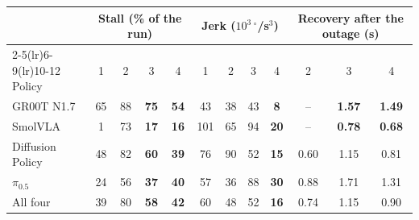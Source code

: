 \begin{tabular}{l cccc cccc ccc}
\toprule
 & \multicolumn{4}{c}{Stall (\% of the run)} & \multicolumn{4}{c}{Jerk ($10^3\,^\circ$/s$^3$)} & \multicolumn{3}{c}{Recovery after the outage (s)} \\
\cmidrule(lr){2-5}\cmidrule(lr){6-9}\cmidrule(lr){10-12}
Policy & 1 & 2 & 3 & 4 & 1 & 2 & 3 & 4 & 2 & 3 & 4 \\
\midrule
GR00T N1.7 & 65 & 88 & \textbf{75} & \textbf{54} & 43 & 38 & 43 & \textbf{8} & -- & \textbf{1.57} & \textbf{1.49} \\
SmolVLA & 1 & 73 & \textbf{17} & \textbf{16} & 101 & 65 & 94 & \textbf{20} & -- & \textbf{0.78} & \textbf{0.68} \\
Diffusion Policy & 48 & 82 & \textbf{60} & \textbf{39} & 76 & 90 & 52 & \textbf{15} & 0.60 & 1.15 & 0.81 \\
$\pi_{0.5}$ & 24 & 56 & \textbf{37} & \textbf{40} & 57 & 36 & 88 & \textbf{30} & 0.88 & 1.71 & 1.31 \\
\midrule
All four & 39 & 80 & \textbf{58} & \textbf{42} & 60 & 48 & 52 & \textbf{16} & 0.74 & 1.15 & 0.90 \\
\bottomrule
\end{tabular}
